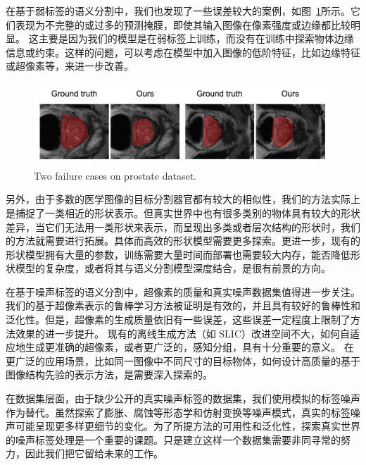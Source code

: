 在基于弱标签的语义分割中，我们也发现了一些误差较大的案例，如图~\ref{fig:failure}所示。它们表现为不完整的或过多的预测掩膜，即使其输入图像在像素强度或边缘都比较明显。
这主要是因为我们的模型是在弱标签上训练，而没有在训练中探索物体边缘信息或约束。这样的问题，可以考虑在模型中加入图像的低阶特征，比如边缘特征或超像素等，来进一步改善。
    \begin{figure}[tbp]
        \centering 
        \includegraphics[width=1.0\textwidth]{img/c3/failure.png}
        {Two failure cases on prostate dataset.}
        \label{fig:failure}
    \end{figure}

另外，由于多数的医学图像的目标分割器官都有较大的相似性，我们的方法实际上是捕捉了一类相近的形状表示。但真实世界中也有很多类别的物体具有较大的形状差异，当它们无法用一类形状来表示，而呈现出多类或者层次结构的形状时，我们的方法就需要进行拓展。具体而高效的形状模型需要更多探索。更进一步，现有的形状模型拥有大量的参数，训练需要大量时间而部署也需要较大内存，能否降低形状模型的复杂度，或者将其与语义分割模型深度结合，是很有前景的方向。

在基于噪声标签的语义分割中，超像素的质量和真实噪声数据集值得进一步关注。
我们的基于超像素表示的鲁棒学习方法被证明是有效的，并且具有较好的鲁棒性和泛化性。但是，超像素的生成质量依旧有一些误差，这些误差一定程度上限制了方法效果的进一步提升。
现有的离线生成方法（如 SLIC）改进空间不大，如何自适应地生成更准确的超像素，或者更广泛的，感知分组，具有十分重要的意义。
在更广泛的应用场景，比如同一图像中不同尺寸的目标物体，如何设计高质量的基于图像结构先验的表示方法，是需要深入探索的。

在数据集层面，由于缺少公开的真实噪声标签的数据集，我们使用模拟的标签噪声作为替代。虽然探索了膨胀、腐蚀等形态学和仿射变换等噪声模式，真实的标签噪声可能呈现更多样更细节的变化。为了所提方法的可用性和泛化性，探索真实世界的噪声标签处理是一个重要的课题。只是建立这样一个数据集需要非同寻常的努力，因此我们把它留给未来的工作。